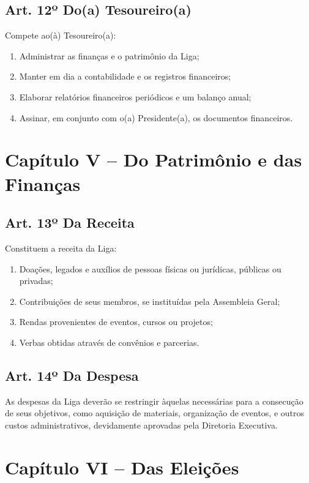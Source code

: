 \documentclass[12pt, a4paper]{article}
\begin{document}
\subsection{Art. 12º Do(a) Tesoureiro(a)}
Compete ao(à) Tesoureiro(a):
\begin{enumerate}[label=\alph*)]
    \item Administrar as finanças e o patrimônio da Liga;
    \item Manter em dia a contabilidade e os registros financeiros;
    \item Elaborar relatórios financeiros periódicos e um balanço anual;
    \item Assinar, em conjunto com o(a) Presidente(a), os documentos financeiros.
\end{enumerate}


\section{Capítulo V – Do Patrimônio e das Finanças}


\subsection{Art. 13º Da Receita}
Constituem a receita da Liga:
\begin{enumerate}[label=\alph*)]
    \item Doações, legados e auxílios de pessoas físicas ou jurídicas, públicas ou privadas;
    \item Contribuições de seus membros, se instituídas pela Assembleia Geral;
    \item Rendas provenientes de eventos, cursos ou projetos;
    \item Verbas obtidas através de convênios e parcerias.
\end{enumerate}

\subsection{Art. 14º Da Despesa}
As despesas da Liga deverão se restringir àquelas necessárias para a consecução de seus objetivos, como aquisição de materiais, organização de eventos, e outros custos administrativos, devidamente aprovadas pela Diretoria Executiva.


\section{Capítulo VI – Das Eleições}
\end{document}
